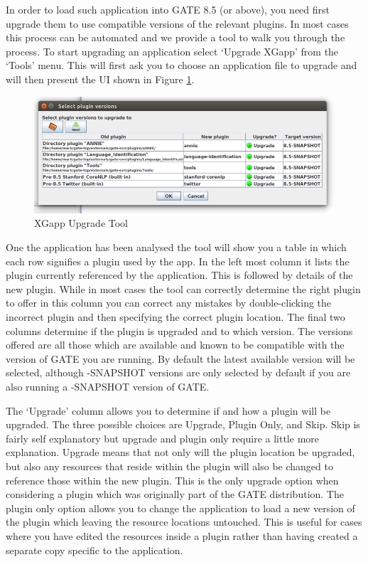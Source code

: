 In order to load such application into GATE 8.5 (or above), you need first upgrade them to use compatible versions of the relevant plugins.
In most cases this process can be automated and we provide a tool to walk you through the process. To start upgrading an application select
`Upgrade XGapp' from the `Tools' menu. This will first ask you to choose an application file to upgrade and will then present the UI shown in
Figure \ref{fig:upgrade-tool}.

\begin{figure}[htb]
\begin{center}
\includegraphics{upgrade-tool.png}
\end{center}
\caption{XGapp Upgrade Tool}
\label{fig:upgrade-tool}
\end{figure}

One the application has been analysed the tool will show you a table in which each row signifies a plugin used by the app. In the left most
column it lists the plugin currently referenced by the application. This is followed by details of the new plugin. While in most cases
the tool can correctly determine the right plugin to offer in this column you can correct any mistakes by double-clicking the incorrect
plugin and then specifying the correct plugin location. The final two columns determine if the plugin is upgraded and to which version.
The versions offered are all those which are available and known to be compatible with the version of GATE you are running. By default the
latest available version will be selected, although -SNAPSHOT versions are only selected by default if you are also running a -SNAPSHOT version
of GATE.

The `Upgrade' column allows you to determine if and how a plugin will be upgraded. The three possible choices are Upgrade, Plugin Only, and Skip.
Skip is fairly self explanatory but upgrade and plugin only require a little more explanation. Upgrade means that not only will the plugin location
be upgraded, but also any resources that reside within the plugin will also be changed to reference those within the new plugin. This is the only
upgrade option when considering a plugin which was originally part of the GATE distribution. The plugin only option allows you to change the application
to load a new version of the plugin which leaving the resource locations untouched. This is useful for cases where you have edited the resources inside a
plugin rather than having created a separate copy specific to the application.

